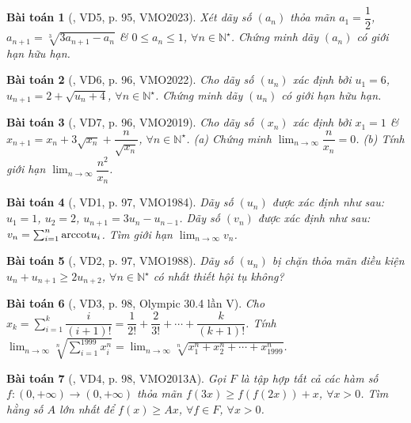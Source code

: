 \documentclass{article}
\newtheorem{baitoan}{Bài toán}
\begin{document}
\begin{baitoan}[\cite{Hung_nang_cao_phat_trien_Toan_11_tap_1}, VD5, p. 95, VMO2023]
	Xét dãy số $(a_n)$ thỏa mãn $a_1 = \dfrac{1}{2}$, $a_{n+1} = \sqrt[3]{3a_{n+1} - a_n}$ \& $0\le a_n\le1$, $\forall n\in\mathbb{N}^\star$. Chứng minh dãy $(a_n)$ có giới hạn hữu hạn.
\end{baitoan}

\begin{baitoan}[\cite{Hung_nang_cao_phat_trien_Toan_11_tap_1}, VD6, p. 96, VMO2022]
	Cho dãy số $(u_n)$ xác định bởi $u_1 = 6$, $u_{n+1} = 2 + \sqrt{u_n + 4}$, $\forall n\in\mathbb{N}^\star$.  Chứng minh dãy $(u_n)$ có giới hạn hữu hạn.
\end{baitoan}

\begin{baitoan}[\cite{Hung_nang_cao_phat_trien_Toan_11_tap_1}, VD7, p. 96, VMO2019]
	Cho dãy số $(x_n)$ xác định bởi $x_1 = 1$ \& $x_{n+1} = x_n + 3\sqrt{x_n} + \dfrac{n}{\sqrt{x_n}}$, $\forall n\in\mathbb{N}^\star$. (a) Chứng minh $\lim_{n\to\infty} \dfrac{n}{x_n} = 0$. (b) Tính giới hạn $\lim_{n\to\infty} \dfrac{n^2}{x_n}$.
\end{baitoan}

\begin{baitoan}[\cite{Hung_nang_cao_phat_trien_Toan_11_tap_1}, VD1, p. 97, VMO1984]
	Dãy số $(u_n)$ được xác định như sau: $u_1 = 1$, $u_2 = 2$, $u_{n+1} = 3u_n - u_{n-1}$. Dãy số $(v_n)$ được xác định như sau: $v_n = \sum_{i=1}^n {\rm arccot}u_i$. Tìm giới hạn $\lim_{n\to\infty} v_n$.
\end{baitoan}

\begin{baitoan}[\cite{Hung_nang_cao_phat_trien_Toan_11_tap_1}, VD2, p. 97, VMO1988]
	Dãy số $(u_n)$ bị chặn thỏa mãn điều kiện $u_n + u_{n+1}\ge2u_{n+2}$, $\forall n\in\mathbb{N}^\star$ có nhất thiết hội tụ không?
\end{baitoan}

\begin{baitoan}[\cite{Hung_nang_cao_phat_trien_Toan_11_tap_1}, VD3, p. 98, Olympic 30.4 lần V]
	Cho $x_k = \sum_{i=1}^k \dfrac{i}{(i + 1)!} = \dfrac{1}{2!} + \dfrac{2}{3!} + \cdots + \dfrac{k}{(k + 1)!}$. Tính $\lim_{n\to\infty} \sqrt[n]{\sum_{i=1}^{1999} x_i^n} = \lim_{n\to\infty} \sqrt[n]{x_1^n + x_2^n + \cdots + x_{1999}^n}$.
\end{baitoan}

\begin{baitoan}[\cite{Hung_nang_cao_phat_trien_Toan_11_tap_1}, VD4, p. 98, VMO2013A]
	Gọi $F$ là tập hợp tất cả các hàm số $f:(0,+\infty)\to(0,+\infty)$ thỏa mãn $f(3x)\ge f(f(2x)) + x$, $\forall x > 0$. Tìm hằng số $A$ lớn nhất để $f(x)\ge Ax$, $\forall f\in F$, $\forall x > 0$.
\end{baitoan}
\end{document}
